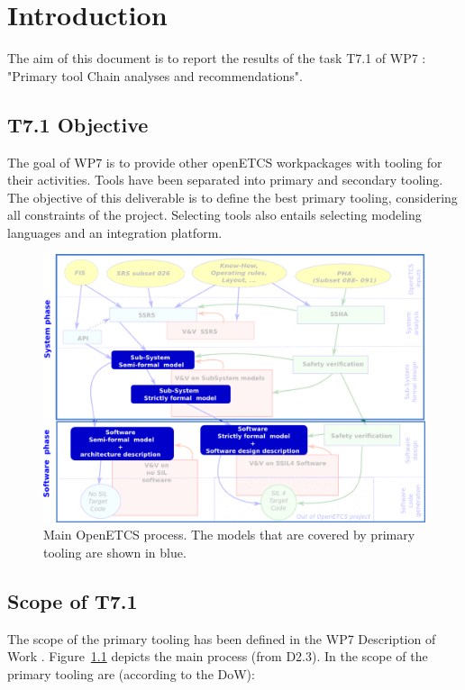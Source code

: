 

\chapter{Introduction}
\label{sec:intro}


The aim of this document is to report the results of the task T7.1 of WP7 :  "Primary tool Chain analyses and recommendations".

\section{T7.1 Objective}

The goal of WP7 is to provide other openETCS workpackages with tooling for their activities.  Tools have been separated into primary and secondary tooling.  The objective of this deliverable is to define the best primary tooling, considering all constraints of the project.  Selecting tools also entails selecting modeling languages and an integration platform.

 \begin{figure}[b!]
  \centering
  \includegraphics[scale=0.45]{images/WholeProcess.png}
  \caption{Main OpenETCS process.  The models that are covered by primary tooling are shown in blue.}
  \label{fig:main_process}
\end{figure}


\section{Scope of T7.1}

The scope of the primary tooling has been defined in the WP7 Description of Work \cite{}.  Figure~\ref{fig:main_process} depicts the main process (from D2.3).  In the scope of the primary tooling are (according to the DoW):

